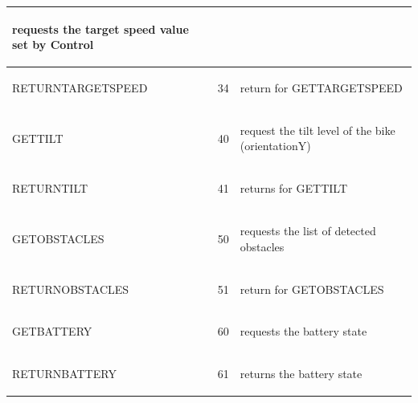 \documentclass[]{scrreprt}
\begin{document}
\begin{table}[H]
\begin{tabular}{|l|l|l|}
\begin{pbox}{7.0cm}{\vspace{.2\baselineskip}
					requests the target speed value set by Control
					\vspace{.3\baselineskip}}
			\end{pbox}\\
			\hline 
			RETURNTARGETSPEED & 34 & 
			\begin{pbox}{7.0cm}{\vspace{.2\baselineskip}
					return for GETTARGETSPEED 
					\vspace{.3\baselineskip}}
			\end{pbox}\\
			\hline 
			GETTILT & 40 & 
			\begin{pbox}{7.0cm}{\vspace{.2\baselineskip}
					request the tilt level of the bike (orientationY)
					\vspace{.3\baselineskip}}
			\end{pbox}\\
			\hline 
			RETURNTILT & 41 & 
			\begin{pbox}{7.0cm}{\vspace{.2\baselineskip}
					returns for GETTILT
					\vspace{.3\baselineskip}}
			\end{pbox}\\
			\hline 
			GETOBSTACLES & 50 & 
			\begin{pbox}{7.0cm}{\vspace{.2\baselineskip}
					requests the list of detected obstacles
					\vspace{.3\baselineskip}}
			\end{pbox}\\
			\hline 
			RETURNOBSTACLES & 51 & 
			\begin{pbox}{7.0cm}{\vspace{.2\baselineskip}
					return for GETOBSTACLES
					\vspace{.3\baselineskip}}
			\end{pbox}\\
			\hline 
			GETBATTERY & 60 & 
			\begin{pbox}{7.0cm}{\vspace{.2\baselineskip}
					requests the battery state
					\vspace{.3\baselineskip}}
			\end{pbox}\\
			\hline 
			RETURNBATTERY & 61 & 
			\begin{pbox}{7.0cm}{\vspace{.2\baselineskip}
					returns the battery state
					\vspace{.3\baselineskip}}
			\end{pbox}\\

\end{tabular}
\end{table}
\end{document}
